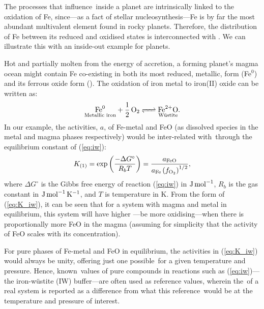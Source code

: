 The processes that influence \fo\,inside a planet are intrinsically linked to the oxidation of Fe, since---as a fact of stellar nucleosynthesis---Fe is by far the most abundant multivalent element found in rocky planets. Therefore, the distribution of Fe between its reduced and oxidised states is interconnected with \fo. We can illustrate this with an inside-out example for planets. 

Hot and partially molten from the energy of accretion, a forming planet's magma ocean might contain Fe co-existing in both its most reduced, metallic, form (Fe$^0$) and its ferrous oxide form (). The oxidation of iron metal to iron(II) oxide can be written as:
\begin{equation}\label{eq:iw}
\ce{ $\underset{\text{Metallic iron}}{\ce{Fe^0}}$ + \frac{1}{2} O2 <=> $\underset{\text{W\"ustite}}{\ce{Fe^{2+}O}}$ }.
\end{equation}
In our example, the activities, $a$, of Fe-metal and FeO (as dissolved species in the metal and magma phases respectively) would be inter-related with \fo\,through the equilibrium constant of (\ref{eq:iw}):
\begin{equation}\label{eq:K_iw}
K_{(1)} = \exp{\left(\frac{-\Delta G^\circ}{R_bT}\right)} = \frac{a_{\ce{FeO}}}{a_{\ce{Fe}}\left(f_{\ce{O2}}\right)^{1/2}},
\end{equation}
where $\Delta G^\circ$ is the Gibbs free energy of reaction (\ref{eq:iw}) in ${\rm J}\,{\rm mol}^{-1}$, $R_b$ is the gas constant in ${\rm J}\,{\rm mol}^{-1}\,{\rm K}^{-1}$, and $T$ is temperature in K. From the form of (\ref{eq:K_iw}), it can be seen that for a system with magma and metal in equilibrium, this system will have higher \fo---be more oxidising---when there is proportionally more FeO in the magma (assuming for simplicity that the activity of FeO scales with its concentration).

For pure phases of Fe-metal and FeO in equilibrium, the activities in (\ref{eq:K_iw}) would always be unity, offering just one possible \fo\,for a given temperature and pressure. Hence, known \fo\,values of pure compounds in reactions such as (\ref{eq:iw})---the iron-w\"ustite (IW) buffer---are often used as reference values, wherein the \fo\,of a real system is reported as a difference from what this reference \fo\,would be at the temperature and pressure of interest.  %

